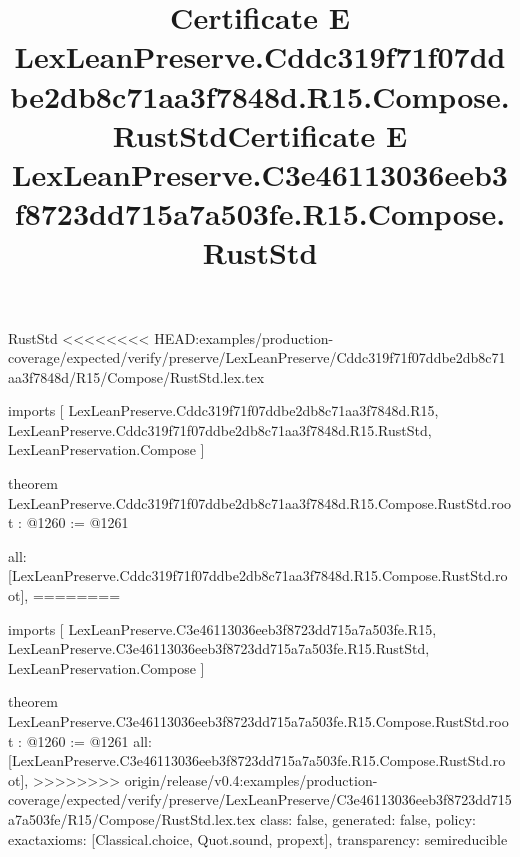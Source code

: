 \begin{lexlean}{RustStd}
<<<<<<<< HEAD:examples/production-coverage/expected/verify/preserve/LexLeanPreserve/Cddc319f71f07ddbe2db8c71aa3f7848d/R15/Compose/RustStd.lex.tex
\title{Certificate E LexLeanPreserve.Cddc319f71f07ddbe2db8c71aa3f7848d.R15.Compose.RustStd}
\begin{coremodule}
imports [
  LexLeanPreserve.Cddc319f71f07ddbe2db8c71aa3f7848d.R15,
  LexLeanPreserve.Cddc319f71f07ddbe2db8c71aa3f7848d.R15.RustStd,
  LexLeanPreservation.Compose
]

theorem LexLeanPreserve.Cddc319f71f07ddbe2db8c71aa3f7848d.R15.Compose.RustStd.root : @1260 := @1261 {
  all: [LexLeanPreserve.Cddc319f71f07ddbe2db8c71aa3f7848d.R15.Compose.RustStd.root],
========
\title{Certificate E LexLeanPreserve.C3e46113036eeb3f8723dd715a7a503fe.R15.Compose.RustStd}
\begin{coremodule}
imports [
  LexLeanPreserve.C3e46113036eeb3f8723dd715a7a503fe.R15,
  LexLeanPreserve.C3e46113036eeb3f8723dd715a7a503fe.R15.RustStd,
  LexLeanPreservation.Compose
]

theorem LexLeanPreserve.C3e46113036eeb3f8723dd715a7a503fe.R15.Compose.RustStd.root : @1260 := @1261 {
  all: [LexLeanPreserve.C3e46113036eeb3f8723dd715a7a503fe.R15.Compose.RustStd.root],
>>>>>>>> origin/release/v0.4:examples/production-coverage/expected/verify/preserve/LexLeanPreserve/C3e46113036eeb3f8723dd715a7a503fe/R15/Compose/RustStd.lex.tex
  class: false,
  generated: false,
  policy: exact{axioms: [Classical.choice, Quot.sound, propext]},
  transparency: semireducible
}


\end{coremodule}}
\end{coremodule}
\end{lexlean}
